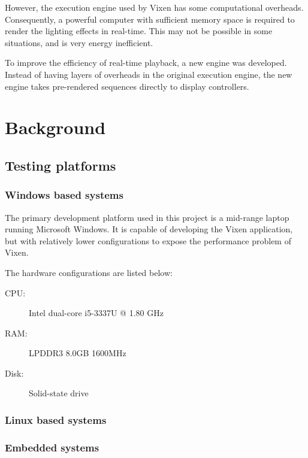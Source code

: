 \documentclass[journal]{IEEEtran}
\begin{document}
However, the execution engine used by Vixen has some computational overheads. Consequently, a powerful computer with sufficient memory space is required to render the lighting effects in real-time. This may not be possible in some situations, and is very energy inefficient.

To improve the efficiency of real-time playback, a new engine was developed. Instead of having layers of overheads in the original execution engine, the new engine takes pre-rendered sequences directly to display controllers.


\section{Background}

\subsection{Testing platforms}

\subsubsection{Windows based systems}

The primary development platform used in this project is a mid-range laptop running Microsoft Windows. It is capable of developing the Vixen application, but with relatively lower configurations to expose the performance problem of Vixen.

The hardware configurations are listed below:

\begin{description}
	\item[CPU:]	Intel dual-core i5-3337U @ 1.80 GHz
	\item[RAM:]	LPDDR3 8.0GB 1600MHz
	\item[Disk:]	Solid-state drive
\end{description}

\subsubsection{Linux based systems}
\hfill
{}

\subsubsection{Embedded systems}
\hfill
{}
\end{document}
